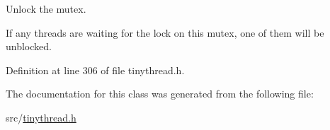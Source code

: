 Unlock the mutex. 

If any threads are waiting for the lock on this mutex, one of them will be unblocked. 

Definition at line 306 of file tinythread.\+h.



The documentation for this class was generated from the following file\+:\begin{DoxyCompactItemize}
\item 
src/\hyperlink{tinythread_8h}{tinythread.\+h}\end{DoxyCompactItemize}
